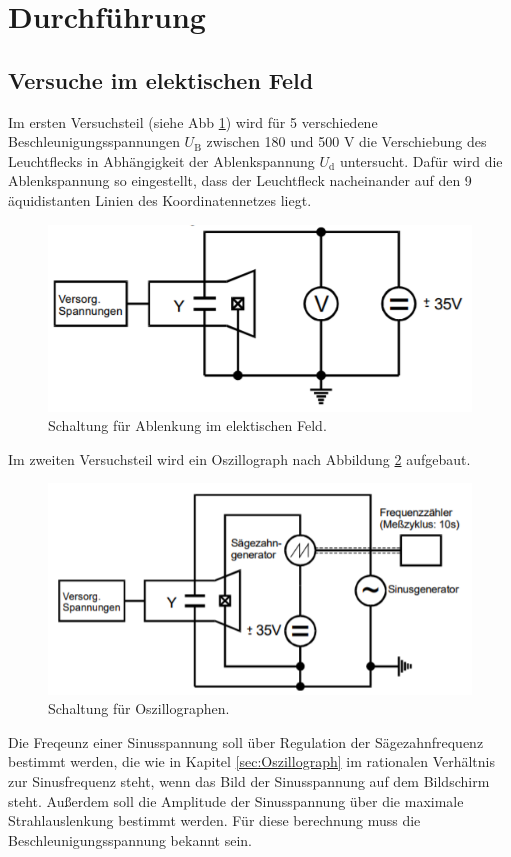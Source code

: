 \section{Durchführung}
\label{sec:Durchführung}

\subsection{Versuche im elektischen Feld}

Im ersten Versuchsteil (siehe Abb \ref{fig:V1}) wird für 5 verschiedene Beschleunigungsspannungen $U_\text{B}$ zwischen 180 und 500 V die Verschiebung des Leuchtflecks in Abhängigkeit der Ablenkspannung $U_\text{d}$ untersucht.
Dafür wird die Ablenkspannung so eingestellt, dass der Leuchtfleck nacheinander auf den 9 äquidistanten Linien des Koordinatennetzes liegt.
\begin{figure}
  \centering
  \includegraphics{data/V1.png}
  \caption{Schaltung für Ablenkung im elektischen Feld.}
  \label{fig:V1}
\end{figure}

Im zweiten Versuchsteil wird ein Oszillograph nach Abbildung \ref{fig:V2} aufgebaut.
\begin{figure}
  \centering
  \includegraphics{data/V2.png}
  \caption{Schaltung für Oszillographen.}
  \label{fig:V2}
\end{figure}
Die Freqeunz einer Sinusspannung soll über Regulation der Sägezahnfrequenz bestimmt werden, die wie in Kapitel \ref{sec:Oszillograph} im rationalen Verhältnis zur Sinusfrequenz steht, wenn das Bild der Sinusspannung auf dem Bildschirm steht.
Außerdem soll die Amplitude der Sinusspannung über die maximale Strahlauslenkung bestimmt werden.
Für diese berechnung muss die Beschleunigungsspannung bekannt sein.

